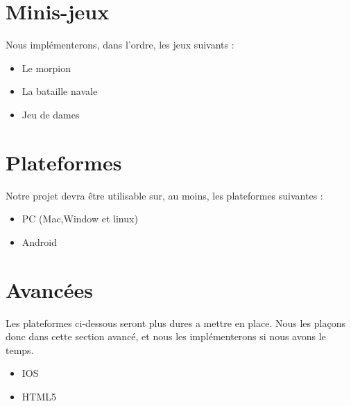 \documentclass{report}
\begin{document}
\section{Minis-jeux}
Nous implémenterons, dans l’ordre, les jeux suivants :
\begin{itemize}
	\item Le morpion
    \item La bataille navale
    \item Jeu de dames
\end{itemize}
\section{Plateformes}
Notre projet devra être utilisable sur, au moins, les plateformes suivantes :
\begin{itemize}
	\item PC (Mac,Window et linux)
    \item Android
\end{itemize}
\section{Avancées}
Les plateformes ci-dessous seront plus dures a mettre en place. Nous les plaçons donc dans cette section avancé, et nous les implémenterons si nous avons le temps.
\begin{itemize}
    \item IOS
    \item HTML5
\end{itemize}
\end{document}
